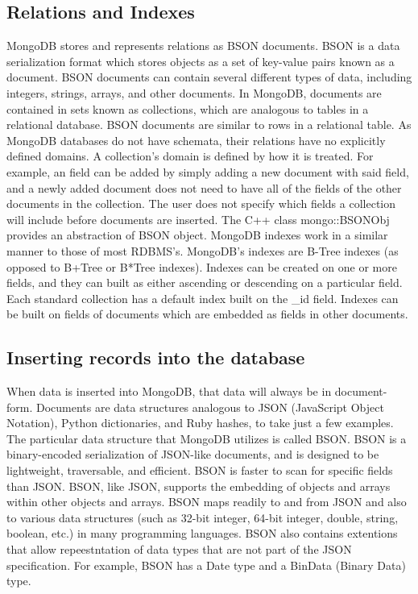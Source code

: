 \documentclass{dependencies/acm_proc_article-sp}
\begin{document}
\subsection{Relations and Indexes}
MongoDB stores and represents relations as BSON documents\cite{1}.
BSON is a data serialization format which stores objects as a set of key-value pairs known as a document.
BSON documents can contain several different types of data, including integers, strings, arrays, and other documents\cite{2}.
In MongoDB, documents are contained in sets known as collections, which are analogous to tables in a relational database\cite{3}.
BSON documents are similar to rows in a relational table.
As MongoDB databases do not have schemata, their relations have no explicitly defined domains.
A collection's domain is defined by how it is treated.
For example, an field can be added by simply adding a new document with said field, and a newly added document does not need to have all of the fields of the other documents in the collection.
The user does not specify which fields a collection will include before documents are inserted\cite{4}.
The C++ class mongo::BSONObj provides an abstraction of BSON object\cite{5}.
MongoDB indexes work in a similar manner to those of most RDBMS's.
MongoDB's indexes are B-Tree indexes (as opposed to B+Tree or B*Tree indexes).
Indexes can be created on one or more fields, and they can built as either ascending or descending on a particular field.
Each standard collection has a default index built on the \_id field.  Indexes can be built on fields of documents which are embedded as fields in other documents\cite{6}.
\subsection{Inserting records into the database}
When data is inserted into MongoDB, that data will always be in document-form.
Documents are data structures analogous to JSON (JavaScript Object Notation), Python dictionaries, and Ruby hashes, to take just a few examples.
The particular data structure that MongoDB utilizes is called BSON.
BSON is a binary-encoded serialization of JSON-like documents, and is designed to be lightweight, traversable, and efficient.
BSON is faster to scan for specific fields than JSON.
BSON, like JSON, supports the embedding of objects and arrays within other objects and arrays.
BSON maps readily to and from JSON and also to various data structures (such as 32-bit integer, 64-bit integer, double, string, boolean, etc.) in many programming languages.
BSON also contains extentions that allow repeestntation of data types that are not part of the JSON specification.
For example, BSON has a Date type and a BinData (Binary Data) type.
\end{document}
